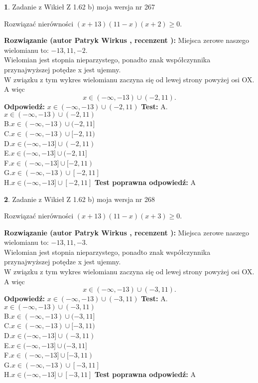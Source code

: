 \documentclass[12pt, a4paper]{article}
\theoremstyle{definition} %
\newtheorem{zad}{}
\newcommand{\zadStart}[1]{\begin{zad}#1\newline}
\newcommand{\zadStop}{\end{zad}}
\newcommand{\rozwStart}[2]{\noindent \textbf{Rozwiązanie (autor #1 , recenzent #2): }\newline}
\newcommand{\rozwStop}{\newline}
\newcommand{\odpStart}{\noindent \textbf{Odpowiedź:}\newline}
\newcommand{\odpStop}{\newline}
\newcommand{\testStart}{\noindent \textbf{Test:}\newline}
\newcommand{\testStop}{\newline}
\newcommand{\kluczStart}{\noindent \textbf{Test poprawna odpowiedź:}\newline}
\newcommand{\kluczStop}{\newline}
\begin{document}
\zadStart{Zadanie z Wikieł Z 1.62 b) moja wersja nr 267}

Rozwiązać nierówności $(x+13)(11-x)(x+2)\ge0$.
\zadStop
\rozwStart{Patryk Wirkus}{}
Miejsca zerowe naszego wielomianu to: $-13, 11, -2$.\\
Wielomian jest stopnia nieparzystego, ponadto znak współczynnika przy\linebreak najwyższej potędze x jest ujemny.\\ W związku z tym wykres wielomianu zaczyna się od lewej strony powyżej osi OX. A więc $$x \in (-\infty,-13) \cup (-2,11).$$
\rozwStop
\odpStart
$x \in (-\infty,-13) \cup (-2,11)$
\odpStop
\testStart
A.$x \in (-\infty,-13) \cup (-2,11)$\\
B.$x \in (-\infty,-13) \cup (-2,11]$\\
C.$x \in (-\infty,-13) \cup [-2,11)$\\
D.$x \in (-\infty,-13] \cup (-2,11)$\\
E.$x \in (-\infty,-13] \cup (-2,11]$\\
F.$x \in (-\infty,-13] \cup [-2,11)$\\
G.$x \in (-\infty,-13) \cup [-2,11]$\\
H.$x \in (-\infty,-13] \cup [-2,11]$
\testStop
\kluczStart
A
\kluczStop



\zadStart{Zadanie z Wikieł Z 1.62 b) moja wersja nr 268}

Rozwiązać nierówności $(x+13)(11-x)(x+3)\ge0$.
\zadStop
\rozwStart{Patryk Wirkus}{}
Miejsca zerowe naszego wielomianu to: $-13, 11, -3$.\\
Wielomian jest stopnia nieparzystego, ponadto znak współczynnika przy\linebreak najwyższej potędze x jest ujemny.\\ W związku z tym wykres wielomianu zaczyna się od lewej strony powyżej osi OX. A więc $$x \in (-\infty,-13) \cup (-3,11).$$
\rozwStop
\odpStart
$x \in (-\infty,-13) \cup (-3,11)$
\odpStop
\testStart
A.$x \in (-\infty,-13) \cup (-3,11)$\\
B.$x \in (-\infty,-13) \cup (-3,11]$\\
C.$x \in (-\infty,-13) \cup [-3,11)$\\
D.$x \in (-\infty,-13] \cup (-3,11)$\\
E.$x \in (-\infty,-13] \cup (-3,11]$\\
F.$x \in (-\infty,-13] \cup [-3,11)$\\
G.$x \in (-\infty,-13) \cup [-3,11]$\\
H.$x \in (-\infty,-13] \cup [-3,11]$
\testStop
\kluczStart
A
\kluczStop
\end{document}
